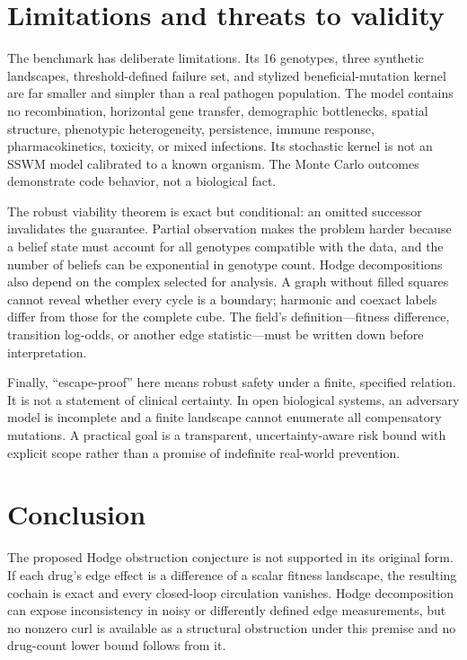 \documentclass[11pt]{article}
\theoremstyle{definition}\newtheorem{definition}[proposition]{Definition}\theoremstyle{remark}\newtheorem{remark}[proposition]{Remark}
\begin{document}
\section{Limitations and threats to validity}
The benchmark has deliberate limitations. Its 16 genotypes, three synthetic landscapes, threshold-defined failure set, and stylized beneficial-mutation kernel are far smaller and simpler than a real pathogen population. The model contains no recombination, horizontal gene transfer, demographic bottlenecks, spatial structure, phenotypic heterogeneity, persistence, immune response, pharmacokinetics, toxicity, or mixed infections. Its stochastic kernel is not an SSWM model calibrated to a known organism. The Monte Carlo outcomes demonstrate code behavior, not a biological fact.

The robust viability theorem is exact but conditional: an omitted successor invalidates the guarantee. Partial observation makes the problem harder because a belief state must account for all genotypes compatible with the data, and the number of beliefs can be exponential in genotype count. Hodge decompositions also depend on the complex selected for analysis. A graph without filled squares cannot reveal whether every cycle is a boundary; harmonic and coexact labels differ from those for the complete cube. The field's definition—fitness difference, transition log-odds, or another edge statistic—must be written down before interpretation.

Finally, “escape-proof” here means robust safety under a finite, specified relation. It is not a statement of clinical certainty. In open biological systems, an adversary model is incomplete and a finite landscape cannot enumerate all compensatory mutations. A practical goal is a transparent, uncertainty-aware risk bound with explicit scope rather than a promise of indefinite real-world prevention.

\section{Conclusion}
The proposed Hodge obstruction conjecture is not supported in its original form. If each drug's edge effect is a difference of a scalar fitness landscape, the resulting cochain is exact and every closed-loop circulation vanishes. Hodge decomposition can expose inconsistency in noisy or differently defined edge measurements, but no nonzero curl is available as a structural obstruction under this premise and no drug-count lower bound follows from it.
\end{document}
